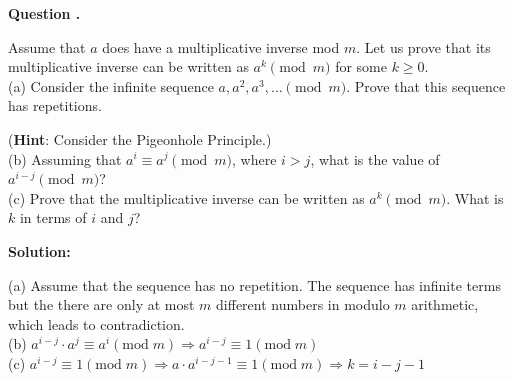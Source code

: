 \documentclass[12pt]{article}
\newcounter{questionnumber}
\newenvironment{question}[1][]{\stepcounter{questionnumber}\par\noindent\textbf{Question \thequestionnumber. #1}\par}{\par}
\newenvironment{solution}{\par\noindent\textbf{Solution:}\par}{\par\vspace{1em}}
\begin{document}
\begin{question}
    Assume that $a$ does have a multiplicative inverse mod $m$. Let us prove that its multiplicative inverse can be written as $a^k \pmod{m}$ for some $k \geq 0$.\\
    (a) Consider the infinite sequence $a, a^2, a^3, \ldots \pmod{m}$. Prove that this sequence has repetitions.

    (\textbf{Hint}: Consider the Pigeonhole Principle.)\\
    (b) Assuming that $a^i \equiv a^j \pmod{m}$, where $i > j$, what is the value of $a^{i-j} \pmod{m}$?\\
    (c) Prove that the multiplicative inverse can be written as $a^k \pmod{m}$. What is $k$ in terms of $i$ and $j$?
\end{question}
\begin{solution}
    \noindent
    (a) Assume that the sequence has no repetition. The sequence has infinite terms but the there are only at most $m$ different numbers in modulo $m$ arithmetic, which leads to contradiction.\\
    (b) $a^{i-j}\cdot a^j\equiv a^i\left( \mathrm{mod}\;m \right) \Longrightarrow a^{i-j}\equiv 1\left( \mathrm{mod}\;m \right) $\\
    (c) $a^{i-j}\equiv 1\left( \mathrm{mod}\;m \right) \Longrightarrow a\cdot a^{i-j-1}\equiv 1\left( \mathrm{mod}\;m \right) \Longrightarrow k=i-j-1$
\end{solution}
\end{document}
